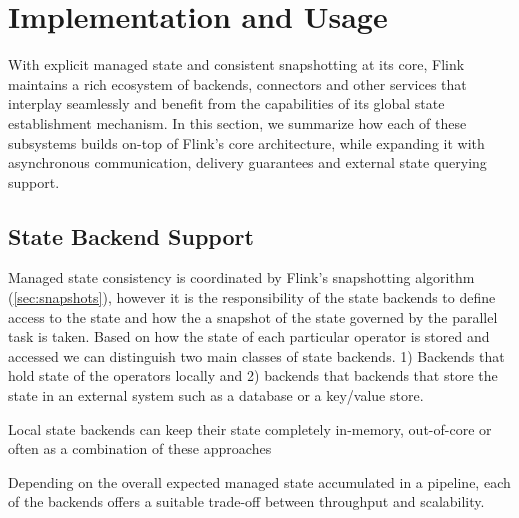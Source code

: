 

\section{Implementation and Usage}

With explicit managed state and consistent snapshotting at its core, Flink maintains a rich ecosystem of backends, connectors and other services that interplay seamlessly and benefit from the capabilities of its global state establishment mechanism. In this section, we summarize how each of these subsystems builds on-top of Flink's core architecture, while expanding it with asynchronous communication, delivery guarantees and external state querying support.

\label{sec:implementation}

\subsection{State Backend Support}

Managed state consistency is coordinated by Flink's snapshotting algorithm (\autoref{sec:snapshots}), however it is the responsibility of the state backends to define access to the state and how the a snapshot of the state governed by the parallel task is taken. Based on how the state of each particular operator is stored and accessed we can distinguish two main classes of state backends. 1) Backends that hold state of the operators locally and 2) backends that backends that store the state in an external system such as a database or a key/value store.

Local state backends can keep their state completely in-memory, out-of-core or often as a combination of these approaches 

Depending on the overall expected managed state accumulated in a pipeline, each of the backends offers a suitable trade-off between throughput and scalability.


